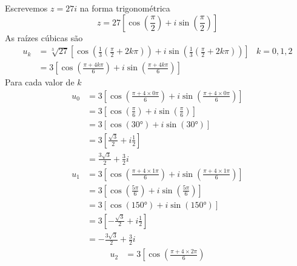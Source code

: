 \documentclass[a4paper,12pt,fleqn]{article}
\begin{document}
\begin{answer}
  Escrevemos \( z = 27i \) na forma trigonométrica
  \[
    z = 27 \left[ \cos\left(\frac{\pi}{2}\right) + i \sin\left(\frac{\pi}{2}\right) \right]
  \]
  As raízes cúbicas são
  \begin{align*}
    u_k
    & = \sqrt[3]{27} \left[
              \cos\left(\frac{1}{3}\left(\frac{\pi}{2} + 2k\pi\right)\right)
          + i \sin\left(\frac{1}{3}\left(\frac{\pi}{2} + 2k\pi\right)\right)
        \right]
    & k = 0, 1, 2    \\[2mm]
    & = 3 \left[
            \cos\left( \frac{\pi + 4k\pi}{6} \right)
        + i \sin\left( \frac{\pi + 4k\pi}{6} \right)
        \right]
  \end{align*}
  Para cada valor de $k$
  \begin{align*}
    u_0
    & = 3 \left[
              \cos\left( \frac{\pi + 4\times0\pi}{6} \right)
          + i \sin\left( \frac{\pi + 4\times0\pi}{6} \right)
          \right] \\[2mm]
    & = 3 \left[
              \cos\left( \frac{\pi}{6} \right)
          + i \sin\left( \frac{\pi}{6} \right)
          \right] \\[2mm]
    & = 3 \left[
              \cos\left( \ang{30} \right)
          + i \sin\left( \ang{30} \right)
          \right] \\[2mm]
    & = 3 \left[
              \frac{\sqrt{3}}{2}
          + i \frac{1}{2}
          \right] \\[2mm]
    & = \frac{3\sqrt{3}}{2} + \frac{3}{2} i
  \end{align*}
  \begin{align*}
    u_1
    & = 3 \left[
              \cos\left( \frac{\pi + 4\times1\pi}{6} \right)
          + i \sin\left( \frac{\pi + 4\times1\pi}{6} \right)
          \right] \\[2mm]
    & = 3 \left[
              \cos\left( \frac{5\pi}{6} \right)
          + i \sin\left( \frac{5\pi}{6} \right)
          \right] \\[2mm]
    & = 3 \left[
              \cos\left( \ang{150} \right)
          + i \sin\left( \ang{150} \right)
          \right] \\[2mm]
    & = 3 \left[
            - \frac{\sqrt{3}}{2}
          + i \frac{1}{2}
          \right] \\[2mm]
    & = -\frac{3\sqrt{3}}{2} + \frac{3}{2}i
  \end{align*}
  \begin{align*}
    u_2
    & = 3 \left[
              \cos\left( \frac{\pi + 4\times2\pi}{6} \right)

\end{align*}
\end{answer}
\end{document}
